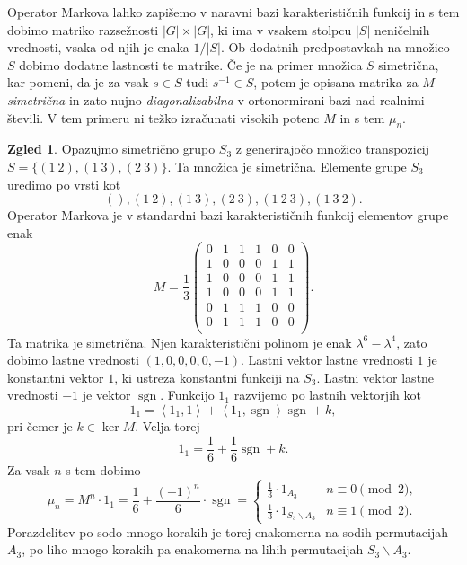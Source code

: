 \documentclass[11pt]{book}
\DeclareMathOperator\sgn{sgn}
\theoremstyle{definition}
\theoremstyle{zgled}
\newtheorem{zgled}[theorem]{Zgled}
\theoremstyle{zgledbrezstevilke}
\theoremstyle{odprtproblem}
\theoremstyle{domacanaloga}
\theoremstyle{izrek}
\begin{document}
Operator Markova lahko zapišemo v naravni bazi karakterističnih funkcij in s tem dobimo matriko razsežnosti $|G| \times |G|$, ki ima v vsakem stolpcu $|S|$ neničelnih vrednosti, vsaka od njih je enaka $1/|S|$. Ob dodatnih predpostavkah na množico $S$ dobimo dodatne lastnosti te matrike. Če je na primer množica $S$ simetrična, kar pomeni, da je za vsak $s \in S$ tudi $s^{-1} \in S$, potem je opisana matrika za $M$ \emph{simetrična} in zato nujno \emph{diagonalizabilna} v ortonormirani bazi nad realnimi števili. V tem primeru ni težko izračunati visokih potenc $M$ in s tem $\mu_n$.

\begin{zgled}
Opazujmo simetrično grupo $S_3$ z generirajočo množico transpozicij $S = \{ (1 \ 2), (1 \ 3), (2 \ 3)\}$. Ta množica je simetrična. Elemente grupe $S_3$ uredimo po vrsti kot
\[
    (),
    (1 \ 2),
    (1 \ 3),
    (2 \ 3),
    (1 \ 2 \ 3),
    (1 \ 3 \ 2).
\]
Operator Markova je v standardni bazi karakterističnih funkcij 
elementov grupe enak
\[
    M = \frac13 \begin{pmatrix}
        0 & 1 & 1 & 1 & 0 & 0 \\
        1 & 0 & 0 & 0 & 1 & 1 \\
        1 & 0 & 0 & 0 & 1 & 1 \\
        1 & 0 & 0 & 0 & 1 & 1 \\
        0 & 1 & 1 & 1 & 0 & 0 \\
        0 & 1 & 1 & 1 & 0 & 0 \\
    \end{pmatrix}.
\]
Ta matrika je simetrična. Njen karakteristični polinom je enak $\lambda^6 - \lambda^4$, zato dobimo lastne vrednosti $(1,0,0,0,0,-1)$. Lastni vektor lastne vrednosti $1$ je konstantni vektor $1$, ki ustreza konstantni funkciji na $S_3$. Lastni vektor lastne vrednosti $-1$ je vektor $\sgn$. Funkcijo $1_1$ razvijemo po lastnih vektorjih kot
\[
    1_1 = 
    \left\langle 1_1, 1 \right\rangle +
    \left\langle 1_1, \sgn \right\rangle \sgn +
    k,
\]
pri čemer je $k \in \ker M$. Velja torej
\[
    1_1 =
    \frac{1}{6} + \frac{1}{6} \sgn + k.
\]
Za vsak $n$ s tem dobimo
\[
    \mu_n = M^n \cdot 1_1 = \frac{1}{6} + \frac{(-1)^n}{6} \cdot \sgn
    = \begin{cases}
        \frac{1}{3} \cdot 1_{A_3} & n \equiv 0 \pmod{2}, \\
        \frac{1}{3} \cdot 1_{S_3 \backslash A_3} & n \equiv 1 \pmod{2}.
    \end{cases}
\]
Porazdelitev po sodo mnogo korakih je torej enakomerna na sodih permutacijah $A_3$, po liho mnogo korakih pa enakomerna na lihih permutacijah $S_3 \backslash A_3$.
\end{zgled}
\end{document}
